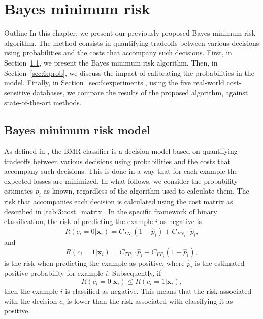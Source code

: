 \chapter{Bayes minimum risk}\label{ch:6}

\begin{remark}{Outline}
In this chapter, we present our previously proposed Bayes minimum risk algorithm. The method 
consists in quantifying tradeoffs between various decisions using probabilities and the costs that 
accompany such decisions. First, in Section~\ref{sec:6:bmr}, we present the Bayes minimum risk 
algorithm. Then, in Section~\ref{sec:6:prob}, we discuss the impact of calibrating the probabilities 
in the model. Finally, in Section~\ref{sec:6:experiments},  using the five real-world cost-sensitive 
databases, we compare the results of the proposed algorithm, against state-of-the-art methods.
\end{remark}


\section{Bayes minimum risk model}
\label{sec:6:bmr}


As defined in \citep{Ghosh2006}, the BMR classifier is a decision model based on quantifying 
tradeoffs between various decisions using probabilities and the costs that accompany such decisions. 
This is done in a way that for each example the expected losses are minimized. In  what follows, we 
consider the probability estimates $\hat p_i$ as known, regardless of the algorithm used to 
calculate them.  The risk that accompanies each decision is calculated using the cost matrix 
as described in \tablename{ \ref{tab:3:cost_matrix}}. In the specific framework of binary 
classification, the risk of predicting the example $i$ as negative is 
\begin{equation}
  R(c_i=0|\mathbf{x}_i)=C_{TN_i}(1-\hat p_i)+C_{FN_i} \cdot \hat p_i, 
\end{equation}
and
\begin{equation}
  R(c_i=1|\mathbf{x}_i)=C_{TP_i} \cdot \hat p_i + C_{FP_i}(1- \hat p_i), 
\end{equation}
is the risk when predicting the example as positive, where $\hat p_i$ is the estimated positive 
probability for example $i$. Subsequently, if 
\begin{equation}
  R(c_i=0|\mathbf{x}_i) \le R(c_i=1|\mathbf{x}_i), 
\end{equation}
then  the example $i$ is classified as negative. This means that the risk associated with the 
decision $c_i$ is lower than the risk associated with classifying it as positive. 

